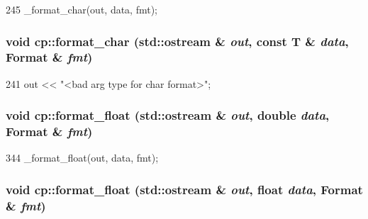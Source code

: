 \begin{DoxyCode}
245 { _format_char(out, data, fmt); }
\end{DoxyCode}
\hypertarget{namespacecp_a6da87dd806888f3952a6a1b0097f86cf}{
\subsubsection[{format\_\-char}]{\setlength{\rightskip}{0pt plus 5cm}void cp::format\_\-char (std::ostream \& {\em out}, \/  const T \& {\em data}, \/  Format \& {\em fmt})}}
\label{namespacecp_a6da87dd806888f3952a6a1b0097f86cf}



\begin{DoxyCode}
241 { out << "<bad arg type for char format>"; }
\end{DoxyCode}
\hypertarget{namespacecp_a5e15926263e49c0f424851264822744f}{
\subsubsection[{format\_\-float}]{\setlength{\rightskip}{0pt plus 5cm}void cp::format\_\-float (std::ostream \& {\em out}, \/  double {\em data}, \/  Format \& {\em fmt})}}
\label{namespacecp_a5e15926263e49c0f424851264822744f}



\begin{DoxyCode}
344 { _format_float(out, data, fmt); }
\end{DoxyCode}
\hypertarget{namespacecp_aa97e39eb705c0bce5b4d1bb37d62a184}{
\subsubsection[{format\_\-float}]{\setlength{\rightskip}{0pt plus 5cm}void cp::format\_\-float (std::ostream \& {\em out}, \/  float {\em data}, \/  Format \& {\em fmt})}}
\label{namespacecp_aa97e39eb705c0bce5b4d1bb37d62a184}



